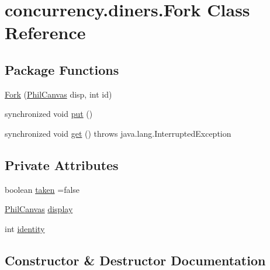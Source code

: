 \hypertarget{classconcurrency_1_1diners_1_1_fork}{}\section{concurrency.\+diners.\+Fork Class Reference}
\label{classconcurrency_1_1diners_1_1_fork}
\subsection*{Package Functions}
\begin{DoxyCompactItemize}
\item 
\mbox{\hyperlink{classconcurrency_1_1diners_1_1_fork_ad81f75b53a9b0302b6da551cc356adf5}{Fork}} (\mbox{\hyperlink{classconcurrency_1_1diners_1_1_phil_canvas}{Phil\+Canvas}} disp, int id)
\item 
synchronized void \mbox{\hyperlink{classconcurrency_1_1diners_1_1_fork_acff549ca1ca1540fa092ac44692624b5}{put}} ()
\item 
synchronized void \mbox{\hyperlink{classconcurrency_1_1diners_1_1_fork_abf1b23ca61bdc54fce3810309e72b876}{get}} ()  throws java.\+lang.\+Interrupted\+Exception 
\end{DoxyCompactItemize}
\subsection*{Private Attributes}
\begin{DoxyCompactItemize}
\item 
boolean \mbox{\hyperlink{classconcurrency_1_1diners_1_1_fork_a875b343f95f6e3f07b2f2f5a5b83efb8}{taken}} =false
\item 
\mbox{\hyperlink{classconcurrency_1_1diners_1_1_phil_canvas}{Phil\+Canvas}} \mbox{\hyperlink{classconcurrency_1_1diners_1_1_fork_a7cb7b2dbd4bc84923557b292b10ac0a9}{display}}
\item 
int \mbox{\hyperlink{classconcurrency_1_1diners_1_1_fork_a27ae9a29dc069079538565c74931a0ef}{identity}}
\end{DoxyCompactItemize}


\subsection{Constructor \& Destructor Documentation}
\mbox{\label{classconcurrency_1_1diners_1_1_fork_ad81f75b53a9b0302b6da551cc356adf5}} 
